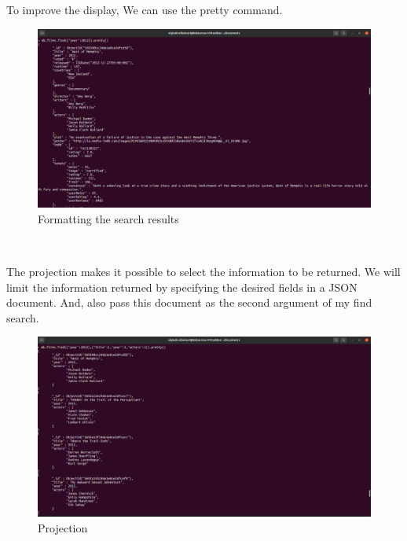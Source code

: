 \begin{spacing}{0.9}
\par To improve the display, We can use the pretty command.
\\
\begin{figure}[!htb] 
\begin{center} 
\includegraphics[width=1\linewidth]{Pictures/MongoDB/Examining MongoDB Query Features/Document search/Formatting the search results} 
\end{center} 
\caption{Formatting the search results} 
\end{figure}  \FloatBarrier
\\
\newpage
\par The projection makes it possible to select the information to be returned. We will limit the information returned by specifying the desired fields in a JSON document. And, also pass this document as the second argument of my find search.
\\
\begin{figure}[!htb] 
\begin{center} 
\includegraphics[width=1\linewidth]{Pictures/MongoDB/Examining MongoDB Query Features/Document search/Projection} 
\end{center} 
\caption{Projection} 
\end{figure}  \FloatBarrier
\\


\end{spacing}

